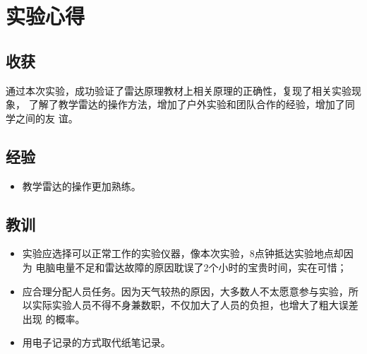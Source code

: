 \documentclass[../main]{subfiles}
\begin{document}
\chapter{实验心得}%
\label{cha:gain}

\section{收获}%
\label{sec:gain}

通过本次实验，成功验证了雷达原理教材上相关原理的正确性，复现了相关实验现象，
了解了教学雷达的操作方法，增加了户外实验和团队合作的经验，增加了同学之间的友
谊。

\section{经验}%
\label{sec:experience}

\begin{itemize}
  \item 教学雷达的操作更加熟练。
\end{itemize}

\section{教训}%
\label{sec:lesson}

\begin{itemize}
  \item 实验应选择可以正常工作的实验仪器，像本次实验，8点钟抵达实验地点却因为
    电脑电量不足和雷达故障的原因耽误了2个小时的宝贵时间，实在可惜；
  \item 应合理分配人员任务。因为天气较热的原因，大多数人不太愿意参与实验，所
    以实际实验人员不得不身兼数职，不仅加大了人员的负担，也增大了粗大误差出现
    的概率。
  \item 用电子记录的方式取代纸笔记录。
\end{itemize}
\end{document}
